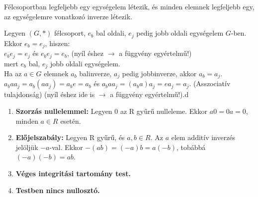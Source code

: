 \documentclass{beamer}
\begin{document}
\begin{frame}[plain]
\end{frame}

\begin{frame}

\begin{tcolorbox}[title={Tétel: Egységelem és inverz félcsoportban}]
Félcsoportban legfeljebb egy egységelem létezik, és minden elemnek legfeljebb egy, az egységelemre vonatkozó inverze létezik.
\end{tcolorbox}

\begin{tcolorbox}[title={Bizonyítás}]
Legyen $(G, *)$ félcsoport, $e_b$ bal oldali, $e_j$ pedig jobb oldali egységelem $G$-ben.\\
Ekkor $e_b = e_j$, hiszen:\\
$e_be_j = e_j$ és $e_be_j = e_b$, (nyíl éshez $\rightarrow$ a függvény egyértelmű!)\\
mert $e_b$ bal, $e_j$ jobb oldali egységelem.\\
Ha az $a \in G$ elemnek $a_b$ balinverze, $a_j$ pedig jobbinverze, akkor $a_b = a_j$.
$a_baa_j = a_b(aa_j) = a_be = a_b$ és $a_baa_j = (a_ba)a_j = ea_j = a_j$. (Asszociatív tulajdonság) (nyíl éshez ide is $\rightarrow$ a függvény egyértelmű!).d
\end{tcolorbox}

\end{frame}

\begin{frame}

\begin{tcolorbox}[title={Lemma: Észrevételek gyűrűkben}]
\begin{enumerate}
\item \textbf{Szorzás nullelemmel:} Legyen 0 az R gyűrű nulleleme. Ekkor $a0 = 0a = 0$, minden $a \in R$ esetén.
\item \textbf{Előjelszabály:} Legyen R gyűrű, és $a, b \in R$. Az $a$ elem additív inverzés jelöljük $-a$-val. Ekkor $-(ab) = (-a)b = a(-b)$, tobábbá $(-a)(-b) = ab$.
\item \textbf{Véges integritási tartomány test.}
\item \textbf{Testben nincs nullosztó.}
\end{enumerate}
\end{tcolorbox}

\end{frame}
\end{document}
